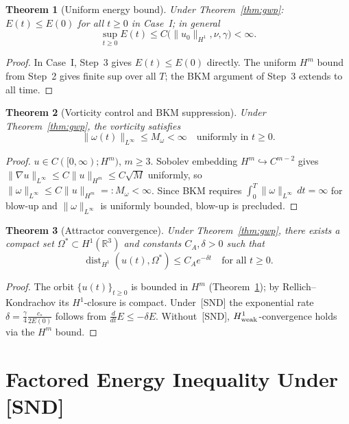 \documentclass[12pt]{amsart}
\newtheorem{theorem}{Theorem}[section]
\theoremstyle{remark}
\newcommand{\R}{\mathbb{R}}
\begin{document}
\begin{theorem}[Uniform energy bound]\label{thm:energy}
Under Theorem~\ref{thm:gwp}: $E(t)\le E(0)$ for all $t\ge 0$ in
Case~I\textup{;} in general
\[
  \sup_{t\ge 0}E(t)\le C\bigl(\|u_0\|_{H^1},\nu,\gamma\bigr)<\infty.
\]
\end{theorem}
\begin{proof}
In Case~I, Step~3 gives $E(t)\le E(0)$ directly.
The uniform $H^m$ bound from Step~2 gives finite sup over all $T$;
the BKM argument of Step~3 extends to all time.
\end{proof}

\begin{theorem}[Vorticity control and BKM suppression]\label{thm:vort}
Under Theorem~\ref{thm:gwp}, the vorticity satisfies
\[
  \|\omega(t)\|_{L^\infty}\le M_\omega<\infty\quad\text{uniformly in }t\ge 0.
\]
\end{theorem}
\begin{proof}
$u\in C([0,\infty);H^m)$, $m\ge 3$.
Sobolev embedding $H^m\hookrightarrow C^{m-2}$ gives
$\|\nabla u\|_{L^\infty}\le C\|u\|_{H^m}\le C\sqrt{M}$ uniformly, so
$\|\omega\|_{L^\infty}\le C\|u\|_{H^m}=:M_\omega<\infty$.
Since BKM requires $\int_0^T\|\omega\|_{L^\infty}\,dt=\infty$ for
blow-up and $\|\omega\|_{L^\infty}$ is uniformly bounded, blow-up is
precluded.
\end{proof}

\begin{theorem}[Attractor convergence]\label{thm:attractor}
Under Theorem~\ref{thm:gwp}, there exists a compact set
$\Omega^*\subset H^1(\R^3)$ and constants $C_A,\delta>0$ such that
\[
  \operatorname{dist}_{H^1}(u(t),\Omega^*)\le C_A e^{-\delta t}
  \quad\text{for all }t\ge 0.
\]
\end{theorem}
\begin{proof}
The orbit $\{u(t)\}_{t\ge 0}$ is bounded in $H^m$ (Theorem~\ref{thm:energy});
by Rellich--Kondrachov its $H^1$-closure is compact.  Under~[SND] the
exponential rate $\delta=\frac{\gamma}{4}\frac{c_*}{2E(0)}$ follows from
$\frac{d}{dt}E\le-\delta E$.  Without~[SND], $H^1_{\rm weak}$-convergence
holds via the $H^m$ bound.
\end{proof}

\section{Factored Energy Inequality Under [SND]}
\label{sec:prop2}
\end{document}
